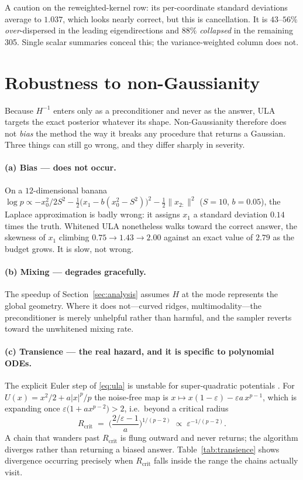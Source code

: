 \documentclass[11pt]{article}
\begin{document}
A caution on the reweighted-kernel row: its per-coordinate standard deviations average to $1.037$,
which looks nearly correct, but this is cancellation. It is $43$--$56\%$ \emph{over}-dispersed in
the leading eigendirections and $88\%$ \emph{collapsed} in the remaining 305. Single scalar
summaries conceal this; the variance-weighted column does not.

\section{Robustness to non-Gaussianity}
\label{sec:nongauss}

Because $H^{-1}$ enters only as a preconditioner and never as the answer, ULA targets the exact
posterior whatever its shape. Non-Gaussianity therefore does not \emph{bias} the method the way it
breaks any procedure that returns a Gaussian. Three things can still go wrong, and they differ
sharply in severity.

\paragraph{(a) Bias --- does not occur.} On a $12$-dimensional banana
$\log p \propto -x_0^2/2S^2 - \tfrac12\big(x_1 - b(x_0^2-S^2)\big)^2 - \tfrac12\|x_{2:}\|^2$
($S=10$, $b=0.05$), the Laplace approximation is badly wrong: it assigns $x_1$ a standard
deviation $0.14$ times the truth. Whitened ULA nonetheless walks toward the correct answer,
the skewness of $x_1$ climbing $0.75 \to 1.43 \to 2.00$ against an exact value of $2.79$ as the
budget grows. It is slow, not wrong.

\paragraph{(b) Mixing --- degrades gracefully.} The speedup of
Section~\ref{sec:analysis} assumes $H$ at the mode represents the global geometry. Where it does
not---curved ridges, multimodality---the preconditioner is merely unhelpful rather than harmful,
and the sampler reverts toward the unwhitened mixing rate.

\paragraph{(c) Transience --- the real hazard, and it is specific to polynomial ODEs.}
The explicit Euler step of \eqref{eq:ula} is unstable for super-quadratic potentials
\cite{robertstweedie}. For $U(x) = x^2/2 + a|x|^p/p$ the noise-free map is
$x \mapsto x(1-\varepsilon) - \varepsilon a\,x^{p-1}$, which is expanding once
$\varepsilon\big(1 + a x^{p-2}\big) > 2$, i.e.\ beyond a critical radius
\begin{equation}
  R_{\text{crit}} \;=\; \Big(\frac{2/\varepsilon - 1}{a}\Big)^{\!1/(p-2)}
  \;\propto\; \varepsilon^{-1/(p-2)} .
  \label{eq:rcrit}
\end{equation}
A chain that wanders past $R_{\text{crit}}$ is flung outward and never returns; the algorithm
diverges rather than returning a biased answer. Table~\ref{tab:transience} shows divergence
occurring precisely when $R_{\text{crit}}$ falls inside the range the chains actually visit.
\end{document}

